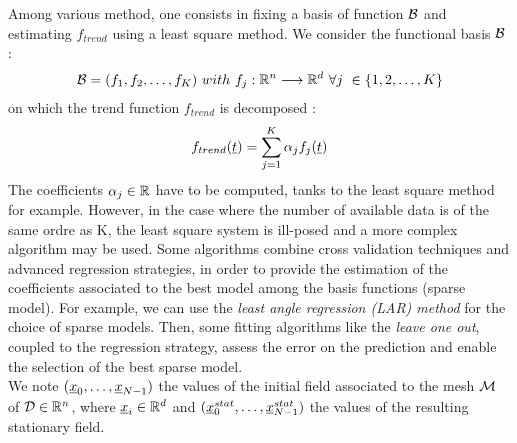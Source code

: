 Among various method, one consists in fixing a basis of function ${\mathcal B}$ and estimating $f_{trend}$ using a least square method. We consider the functional basis ${\mathcal B}$ :
\begin{eqnarray*}
  {\mathcal B} = (f_1, f_2, \ldots, f_K)\ with \ f_j : {\mathbb R}^n \longrightarrow {\mathbb R}^d \ \forall j \ \in \left\{1,2,\ldots,K\right\}
\end{eqnarray*}
on which the trend function $f_{trend}$ is decomposed :
\begin{eqnarray}\label{ftrend}
  f_{trend}({\underline{t}}) = \sum_{j=1}^{K} \alpha_j f_j({\underline{t}})
\end{eqnarray}
The coefficients $\alpha_j \in {\mathbb R}$ have to be computed, tanks to the  least square method for example. However, in the case where the number of available data  is of the same ordre as K, the least square system is ill-posed and a  more complex algorithm may be used. Some algorithms combine cross validation techniques and advanced regression strategies, in order to provide the estimation of the  coefficients associated to the best model among the  basis functions (sparse model). For example, we can use the \emph{least angle regression (LAR)  method} for the choice of sparse models.  Then, some fitting algorithms like the \emph{leave one out}, coupled to the regression strategy, assess the error on the prediction and enable the selection of the best sparse model.\\

We note $({\underline{x}}_0, \dots, {\underline{x}}_{N-1})$ the values of the initial field associated to the mesh ${\mathcal M}$ of ${\mathcal D}\in {\mathbb R}^n$, where ${\underline{x}}_i \in {\mathbb R}^d$ and $({\underline{x}}^{stat}_0, \dots, {\underline{x}}^{stat}_{N-1})$ the values of the resulting stationary field.\\

